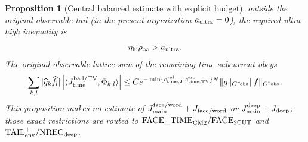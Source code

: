 \documentclass[11pt]{article}
\newtheorem{proposition}[theorem]{Proposition}
\begin{document}
\begin{proposition}[Central balanced estimate with explicit budget]
outside the original-observable tail (in the present organization
$a_{\rm ultra}=0$), the required ultra-high inequality is
\begin{equation}
\label{eq:ultra-high-exponent-window}
 \eta_{\rm hi}\rho_\infty>a_{\rm ultra}.
\end{equation}
The original-observable lattice sum of the remaining time subcurrent obeys
\begin{equation}
\label{eq:time-clock-complete-lattice-bound}
 \sum_{k,l}|\widehat g_k\widehat f_l|
 \left|\langle J_{\rm time}^{\rm bad/TV},\Phi_{k,l}\rangle\right|
 \le C e^{-\min\{c_{\rm time,J}^{\rm val},
                     c_{\rm time,TV}^{\rm src}\}N}
       \|g\|_{C^{r_{\rm obs}}}\|f\|_{C^{r_{\rm obs}}}.
\end{equation}
This proposition makes no estimate of
$J_{\rm main}^{\rm face/word}+J_{\rm face/word}$ or
$J_{\rm main}^{\rm deep}+J_{\rm deep}$; those exact restrictions are routed
to $\mathrm{FACE\_TIME}_{\rm CM2}/\mathrm{FACE}_{\rm 2CUT}$ and
$\mathrm{TAIL}_{\rm env}^{+}/\mathrm{NREC}_{\rm deep}$.
\end{proposition}
\end{document}
